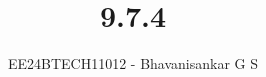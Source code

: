 \documentclass[journal]{IEEEtran}
\begin{document}

\vspace{3cm}

\title{9.7.4}
\author{EE24BTECH11012 - Bhavanisankar G S}
{\let\newpage\relax\maketitle}

\renewcommand{\thefigure}{\theenumi}
\renewcommand{\thetable}{\theenumi}
\setlength{\intextsep}{10pt} %


\renewcommand{\thetable}{\theenumi}
\end{document}

